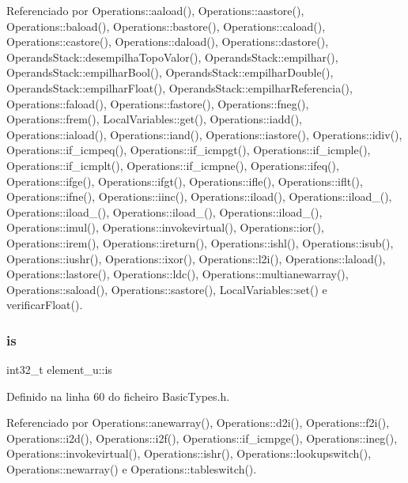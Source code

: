 Referenciado por Operations\+::aaload(), Operations\+::aastore(), Operations\+::baload(), Operations\+::bastore(), Operations\+::caload(), Operations\+::castore(), Operations\+::daload(), Operations\+::dastore(), Operands\+Stack\+::desempilha\+Topo\+Valor(), Operands\+Stack\+::empilhar(), Operands\+Stack\+::empilhar\+Bool(), Operands\+Stack\+::empilhar\+Double(), Operands\+Stack\+::empilhar\+Float(), Operands\+Stack\+::empilhar\+Referencia(), Operations\+::faload(), Operations\+::fastore(), Operations\+::fneg(), Operations\+::frem(), Local\+Variables\+::get(), Operations\+::iadd(), Operations\+::iaload(), Operations\+::iand(), Operations\+::iastore(), Operations\+::idiv(), Operations\+::if\+\_\+icmpeq(), Operations\+::if\+\_\+icmpgt(), Operations\+::if\+\_\+icmple(), Operations\+::if\+\_\+icmplt(), Operations\+::if\+\_\+icmpne(), Operations\+::ifeq(), Operations\+::ifge(), Operations\+::ifgt(), Operations\+::ifle(), Operations\+::iflt(), Operations\+::ifne(), Operations\+::iinc(), Operations\+::iload(), Operations\+::iload\+\_(), Operations\+::iload\+\_(), Operations\+::iload\+\_(), Operations\+::iload\+\_(), Operations\+::imul(), Operations\+::invokevirtual(), Operations\+::ior(), Operations\+::irem(), Operations\+::ireturn(), Operations\+::ishl(), Operations\+::isub(), Operations\+::iushr(), Operations\+::ixor(), Operations\+::l2i(), Operations\+::laload(), Operations\+::lastore(), Operations\+::ldc(), Operations\+::multianewarray(), Operations\+::saload(), Operations\+::sastore(), Local\+Variables\+::set() e verificar\+Float().

\mbox{\label{unionelement__u_a8230539b3b28f57ac3fd61e10c76a740}} 
\subsubsection{\texorpdfstring{is}{is}}
{\footnotesize\ttfamily int32\+\_\+t element\+\_\+u\+::is}



Definido na linha 60 do ficheiro Basic\+Types.\+h.



Referenciado por Operations\+::anewarray(), Operations\+::d2i(), Operations\+::f2i(), Operations\+::i2d(), Operations\+::i2f(), Operations\+::if\+\_\+icmpge(), Operations\+::ineg(), Operations\+::invokevirtual(), Operations\+::ishr(), Operations\+::lookupswitch(), Operations\+::newarray() e Operations\+::tableswitch().

